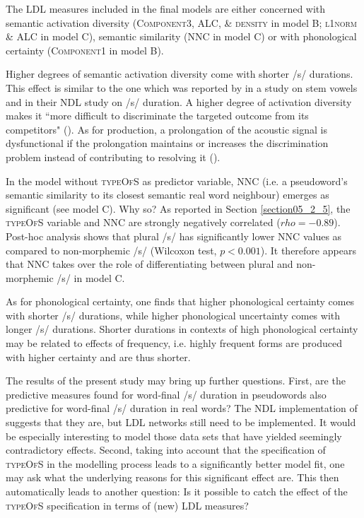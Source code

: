 The LDL measures included in the final models are either concerned with semantic activation diversity (\textsc{Component3}, \textsc{ALC}, \& \textsc{density} in model B; \textsc{l1norm} \& \textsc{ALC} in model C), semantic similarity (\textsc{NNC} in model C) or with phonological certainty (\textsc{Component1} in model B).

Higher degrees of semantic activation diversity come with shorter /s/ durations. This effect is similar to the one which was reported by \citet{Tucker2019Sims} in a study on stem vowels and \citet{Tomaschek2019} in their NDL study on /s/ duration. A higher degree of activation diversity makes it ``more difficult to discriminate the targeted outcome from its competitors" (\cite[27]{Tomaschek2019}). As for production, a prolongation of the acoustic signal is dysfunctional if the prolongation maintains or increases the discrimination problem instead of contributing to resolving it (\cite{Tomaschek2019}).

In the model without \textsc{typeOfS} as predictor variable, \textsc{NNC} (i.e. a pseudoword’s semantic similarity to its closest semantic real word neighbour) emerges as significant (see model C). Why so? As reported in Section \ref{section05_2_5}, the \textsc{typeOfS} variable and \textsc{NNC} are strongly negatively correlated ($rho = -0.89$). Post-hoc analysis shows that plural /s/ has significantly lower \textsc{NNC} values as compared to non-morphemic /s/ (Wilcoxon test,  $p<0.001$). It therefore appears that \textsc{NNC} takes over the role of differentiating between plural and non-morphemic /s/ in model C.

As for phonological certainty, one finds that higher phonological certainty comes with shorter /s/ durations, while higher phonological uncertainty comes with longer /s/ durations. Shorter durations in contexts of high phonological certainty may be related to effects of frequency, i.e. highly frequent forms are produced with higher certainty and are thus shorter. 

The results of the present study may bring up further questions. First, are the predictive measures found for word-final /s/ duration in pseudowords also predictive for word-final /s/ duration in real words? The NDL implementation of \citet{Tomaschek2019} suggests that they are, but LDL networks still need to be implemented. It would be especially interesting to model those data sets that have yielded seemingly contradictory effects. Second, taking into account that the specification of \textsc{typeOfS} in the modelling process leads to a significantly better model fit, one may ask what the underlying reasons for this significant effect are. This then automatically leads to another question: Is it possible to catch the effect of the \textsc{typeOfS} specification in terms of (new) LDL measures? 


